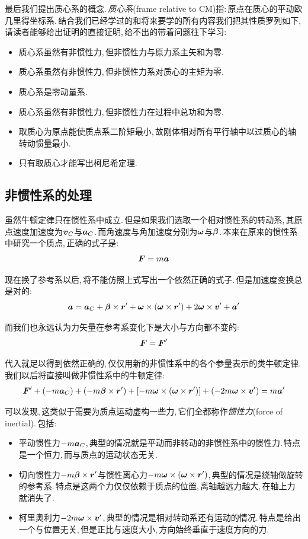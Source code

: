 最后我们提出质心系的概念.\,\emph{质心系}(frame relative to {\rm CM})指:\,原点在质心的平动欧几里得坐标系.\,结合我们已经学过的和将来要学的所有内容我们把其性质罗列如下,\,请读者能够给出证明的直接证明,\,给不出的带着问题往下学习:
\begin{itemize}
	\item 质心系虽然有非惯性力,\,但非惯性力与原力系主矢和为零.
	\item 质心系虽然有非惯性力,\,但非惯性力系对质心的主矩为零.
	\item 质心系是零动量系.
	\item 质心系虽然有非惯性力,\,但非惯性力在过程中总功和为零.
	\item 取质心为原点能使质点系二阶矩最小,\,故刚体相对所有平行轴中以过质心的轴转动惯量最小.
	\item 只有取质心才能写出柯尼希定理.
\end{itemize}

\subsection{非惯性系的处理}
虽然牛顿定律只在惯性系中成立.\,但是如果我们选取一个相对惯性系的转动系,\,其原点速度加速度为$\boldsymbol{v}_C$与$\boldsymbol{a}_C$.\,而角速度与角加速度分别为$\boldsymbol{\omega}$与$\boldsymbol{\beta}$.\,本来在原来的惯性系中研究一个质点,\,正确的式子是:
\[\boldsymbol{F}=m\boldsymbol{a}\]

现在换了参考系以后,\,将不能仿照上式写出一个依然正确的式子.\,但是加速度变换总是对的:
\[\boldsymbol{a}=\boldsymbol{a}_C+\boldsymbol{\beta}\times\boldsymbol{r}'+\boldsymbol{\omega}\times(\boldsymbol{\omega}\times\boldsymbol{r}')+2\boldsymbol{\omega}\times\boldsymbol{v}'+\boldsymbol{a}'\]

而我们也永远认为力矢量在参考系变化下是大小与方向都不变的:
\[\boldsymbol{F}=\boldsymbol{F}'\]

代入就足以得到依然正确的,\,仅仅用新的非惯性系中的各个参量表示的类牛顿定律.\,我们以后将直接叫做非惯性系中的牛顿定律:
\[\boldsymbol{F}'+(-m\boldsymbol{a}_C)+(-m\boldsymbol{\beta}\times\boldsymbol{r}')+[-m\boldsymbol{\omega}\times(\boldsymbol{\omega}\times\boldsymbol{r}')]+(-2m\boldsymbol{\omega}\times\boldsymbol{v}')=m\boldsymbol{a}'\]

可以发现,\,这类似于需要为质点运动虚构一些力,\,它们全都称作\emph{惯性力}(force of inertial).\,包括:
\begin{itemize}
	\item 平动惯性力$-m\boldsymbol{a}_C$,\,典型的情况就是平动而非转动的非惯性系中的惯性力.\,特点是一个恒力,\,而与质点的运动状态无关.
	\item 切向惯性力$-m\boldsymbol{\beta}\times\boldsymbol{r}'$与惯性离心力$-m\boldsymbol{\omega}\times(\boldsymbol{\omega}\times\boldsymbol{r}')$,\,典型的情况是绕轴做旋转的参考系.\,特点是这两个力仅仅依赖于质点的位置,\,离轴越远力越大,\,在轴上力就消失了.
	\item 柯里奥利力$-2m\boldsymbol{\omega}\times\boldsymbol{v}'$,\,典型的情况是相对转动系还有运动的情况.\,特点是给出一个与位置无关,\,但是正比与速度大小,\,方向始终垂直于速度方向的力.
\end{itemize}

